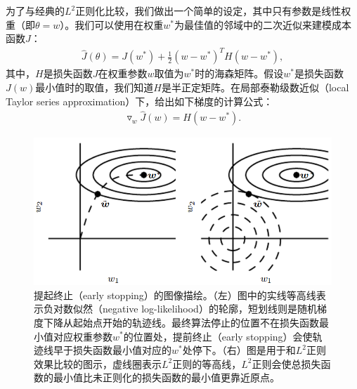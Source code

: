 为了与经典的$L^2$正则化比较，我们做出一个简单的设定，其中只有参数是线性权重（即$\theta = w$）。我们可以使用在权重$w^*$为最佳值的邻域中的二次近似来建模成本函数$J$：
$$
\begin{aligned}
\hat{J} (\theta) = J(w^*) + \frac{1}{2} (w - w^*)^T H(w - w^*),
\end{aligned}
$$
其中，$H$是损失函数$J$在权重参数$w$取值为$w^*$时的海森矩阵。假设$w^*$是损失函数$J(w)$最小值时的取值，我们知道$H$是半正定矩阵。在局部泰勒级数近似（local Taylor series approximation）下，给出如下梯度的计算公式：
$$
\begin{aligned}
\triangledown_w \hat{J}(w) = H(w - w^*).
\end{aligned}
$$
\begin{figure}[htbp] %
   \centering
   \includegraphics[width=5in]{fig/chap7/7_4.png} 
   \caption{提起终止（early stopping）的图像描绘。（左）图中的实线等高线表示负对数似然（negative log-likelihood）的轮廓，短划线则是随机梯度下降从起始点开始的轨迹线。最终算法停止的位置不在损失函数最小值对应权重参数$w^*$的位置处，提前终止（early stopping）会使轨迹线早于损失函数最小值对应的$w^*$处停下。（右）图是用于和$L^2$正则效果比较的图示，虚线圈表示$L^2$正则的等高线，$L^2$正则会使总损失函数的最小值比未正则化的损失函数的最小值更靠近原点。}
   \label{fig:7_4}
\end{figure}

